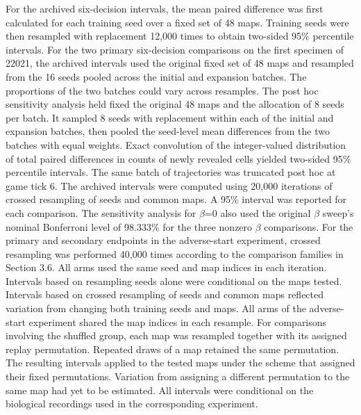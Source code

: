 \documentclass{article}
\begin{document}
For the archived six-decision intervals, the mean paired difference was first calculated for each training seed over a fixed set of 48 maps. Training seeds were then resampled with replacement 12,000 times to obtain two-sided 95\% percentile intervals. For the two primary six-decision comparisons on the first specimen of 22021, the archived intervals used the original fixed set of 48 maps and resampled from the 16 seeds pooled across the initial and expansion batches. The proportions of the two batches could vary across resamples. The post hoc sensitivity analysis held fixed the original 48 maps and the allocation of 8 seeds per batch. It sampled 8 seeds with replacement within each of the initial and expansion batches, then pooled the seed-level mean differences from the two batches with equal weights. Exact convolution of the integer-valued distribution of total paired differences in counts of newly revealed cells yielded two-sided 95\% percentile intervals. The same batch of trajectories was truncated post hoc at game tick 6. The archived intervals were computed using 20,000 iterations of crossed resampling of seeds and common maps. A 95\% interval was reported for each comparison. The sensitivity analysis for \ensuremath{\beta}=0 also used the original \ensuremath{\beta} sweep's nominal Bonferroni level of 98.333\% for the three nonzero \ensuremath{\beta} comparisons. For the primary and secondary endpoints in the adverse-start experiment, crossed resampling was performed 40,000 times according to the comparison families in Section 3.6. All arms used the same seed and map indices in each iteration. Intervals based on resampling seeds alone were conditional on the maps tested. Intervals based on crossed resampling of seeds and common maps reflected variation from changing both training seeds and maps. All arms of the adverse-start experiment shared the map indices in each resample. For comparisons involving the shuffled group, each map was resampled together with its assigned replay permutation. Repeated draws of a map retained the same permutation. The resulting intervals applied to the tested maps under the scheme that assigned their fixed permutations. Variation from assigning a different permutation to the same map had yet to be estimated. All intervals were conditional on the biological recordings used in the corresponding experiment.
\end{document}
